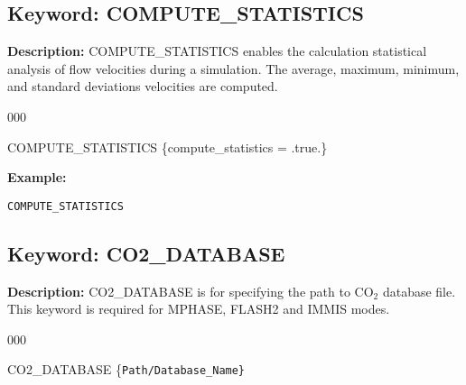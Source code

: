 \hyperlink{target_key}{\return}


\newpage
\protect\hypertarget{target_stat}{}


\subsection{Keyword: COMPUTE\_STATISTICS}

\noindent
{\bf Description:}
COMPUTE\_STATISTICS enables the calculation statistical analysis of flow velocities during a simulation.  The average, maximum, minimum, and standard deviations velocities are computed.

\begin{deflist}{000}
\item [COMPUTE\_STATISTICS] \{compute\_statistics = .true.\}
\end{deflist}


\begin{mdframed}

\noindent
{\bf Example:}
\begin{verbatim}
COMPUTE_STATISTICS
\end{verbatim}
\end{mdframed}

\hyperlink{target_key}{\return}



\newpage
\protect\hypertarget{target_co2dat}{}


\subsection{Keyword: CO2\_DATABASE}

\noindent
{\bf Description:}
CO2\_DATABASE  is for specifying the path to CO$_2$ database file. This keyword is required for MPHASE, FLASH2 and IMMIS modes.

\begin{deflist}{000}
\item [CO2\_DATABASE] \{\tt Path/Database\_Name\}
\end{deflist}

\hyperlink{target_key}{\return}



